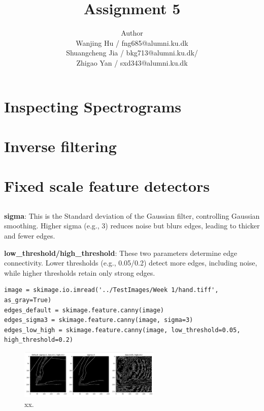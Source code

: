 \documentclass[12pt]{article}
\title{Assignment 5}
\author{Author \\
 Wanjing Hu / fng685@alumni.ku.dk  \\
 Shuangcheng Jia / bkg713@alumni.ku.dk/   \\
 Zhigao Yan / sxd343@alumni.ku.dk  \\
}
\begin{document}
\maketitle

\section{Inspecting Spectrograms}
\section{Inverse filtering}

\section{Fixed scale feature detectors}

\subsection{}

\textbf{sigma}: This is the Standard deviation of the Gaussian filter, controlling Gaussian smoothing. Higher sigma (e.g., 3) reduces noise but blurs edges, leading to thicker and fewer edges.

\textbf{low\_threshold/high\_threshold}: These two parameters determine edge connectivity. Lower thresholds (e.g., 0.05/0.2) detect more edges, including noise, while higher thresholds retain only strong edges.

\begin{lstlisting}
image = skimage.io.imread('../TestImages/Week 1/hand.tiff', as_gray=True)
edges_default = skimage.feature.canny(image)
edges_sigma3 = skimage.feature.canny(image, sigma=3)
edges_low_high = skimage.feature.canny(image, low_threshold=0.05, high_threshold=0.2)
\end{lstlisting}

\begin{figure}[h]
    \centering
    \includegraphics[width=0.6\textwidth]{pics/a5-3.1} 
    \caption{xx.}
\end{figure}

\subsection{}
\end{document}
